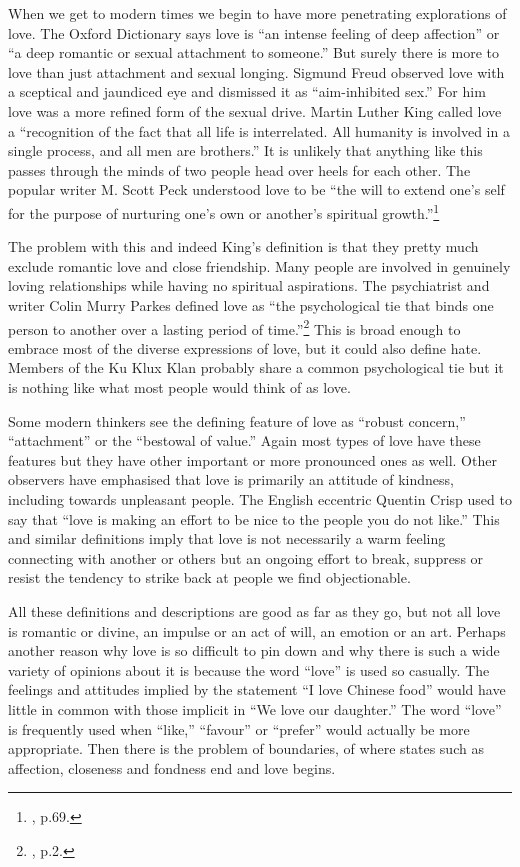 \documentclass[10pt, openright]{book}
\begin{document}
When we get to modern times we begin to have more penetrating explorations of love. The Oxford Dictionary says love is “an intense feeling of deep affection” or “a deep romantic or sexual attachment to someone.” But surely there is more to love than just attachment and sexual longing. Sigmund Freud observed love with a sceptical and jaundiced eye and dismissed it as “aim-inhibited sex.” For him love was a more refined form of the sexual drive. Martin Luther King called love a “recognition of the fact that all life is interrelated. All humanity is involved in a single process, and all men are brothers.” It is unlikely that anything like this passes through the minds of two people head over heels for each other. The popular writer M. Scott Peck understood love to be “the will to extend one’s self for the purpose of nurturing one’s own or another’s spiritual growth.”\footnote {\cite{Peck 1997}, p.69.}


The problem with this and indeed King’s definition is that they pretty much exclude romantic love and close friendship. Many people are involved in genuinely loving relationships while having no spiritual aspirations. The psychiatrist and writer Colin Murry Parkes defined love as “the psychological tie that binds one person to another over a lasting period of time.”\footnote {\cite{Parkes 2009}, p.2.} This is broad enough to embrace most of the diverse expressions of love, but it could also define hate. Members of the Ku Klux Klan probably share a common psychological tie but it is nothing like what most people would think of as love.


Some modern thinkers see the defining feature of love as “robust concern,” “attachment” or the “bestowal of value.” Again most types of love have these features but they have other important or more pronounced ones as well. Other observers have emphasised that love is primarily an attitude of kindness, including towards unpleasant people. The English eccentric Quentin Crisp used to say that “love is making an effort to be nice to the people you do not like.” This and similar definitions imply that love is not necessarily a warm feeling connecting with another or others but an ongoing effort to break, suppress or resist the tendency to strike back at people we find objectionable.


All these definitions and descriptions are good as far as they go, but not all love is romantic or divine, an impulse or an act of will, an emotion or an art. Perhaps another reason why love is so difficult to pin down and why there is such a wide variety of opinions about it is because the word “love” is used so casually. The feelings and attitudes implied by the statement “I love Chinese food” would have little in common with those implicit in “We love our daughter.” The word “love” is frequently used when “like,” “favour” or “prefer” would actually be more appropriate. Then there is the problem of boundaries, of where states such as affection, closeness and fondness end and love begins.
\end{document}
